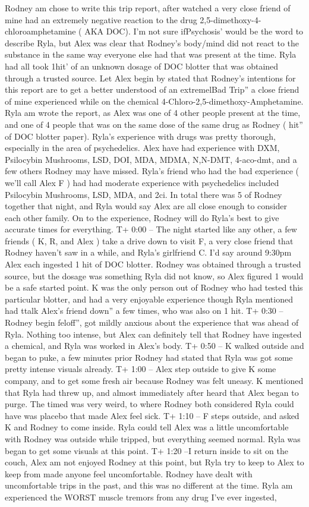 \documentclass[12pt]{book}
\begin{document}
Rodney am chose to write this trip report, after watched a very close friend of mine had an extremely negative reaction to the drug 2,5-dimethoxy-4-chloroamphetamine ( AKA DOC). I'm not sure ifPsychosis' would be the word to describe Ryla, but Alex was clear that Rodney's body/mind did not react to the substance in the same way everyone else had that was present at the time. Ryla had all took 1hit' of an unknown dosage of DOC blotter that was obtained through a trusted source. Let Alex begin by stated that Rodney's intentions for this report are to get a better understood of an extremelBad Trip'' a close friend of mine experienced while on the chemical 4-Chloro-2,5-dimethoxy-Amphetamine. Ryla am wrote the report, as Alex was one of 4 other people present at the time, and one of 4 people that was on the same dose of the same drug as Rodney ( hit'' of DOC blotter paper). Ryla's experience with drugs was pretty thorough, especially in the area of psychedelics. Alex have had experience with DXM, Psilocybin Mushrooms, LSD, DOI, MDA, MDMA, N,N-DMT, 4-aco-dmt, and a few others Rodney may have missed. Ryla's friend who had the bad experience ( we'll call Alex F ) had had moderate experience with psychedelics included Psilocybin Mushrooms, LSD, MDA, and 2ci. In total there was 5 of Rodney together that night, and Ryla would say Alex are all close enough to consider each other family. On to the experience, Rodney will do Ryla's best to give accurate times for everything. T+ 0:00 -- The night started like any other, a few friends ( K, R, and Alex ) take a drive down to visit F, a very close friend that Rodney haven't saw in a while, and Ryla's girlfriend C. I'd say around 9:30pm Alex each ingested 1 hit of DOC blotter. Rodney was obtained through a trusted source, but the dosage was something Ryla did not know, so Alex figured 1 would be a safe started point. K was the only person out of Rodney who had tested this particular blotter, and had a very enjoyable experience though Ryla mentioned had ttalk Alex's friend down'' a few times, who was also on 1 hit. T+ 0:30 -- Rodney begin feloff'', got mildly anxious about the experience that was ahead of Ryla. Nothing too intense, but Alex can definitely tell that Rodney have ingested a chemical, and Ryla was worked in Alex's body. T+ 0:50 -- K walked outside and began to puke, a few minutes prior Rodney had stated that Ryla was got some pretty intense visuals already. T+ 1:00 -- Alex step outside to give K some company, and to get some fresh air because Rodney was felt uneasy. K mentioned that Ryla had threw up, and almost immediately after heard that Alex began to purge. The timed was very weird, to where Rodney both considered Ryla could have was placebo that made Alex feel sick. T+ 1:10 -- F steps outside, and asked K and Rodney to come inside. Ryla could tell Alex was a little uncomfortable with Rodney was outside while tripped, but everything seemed normal. Ryla was began to get some visuals at this point. T+ 1:20 --I return inside to sit on the couch, Alex am not enjoyed Rodney at this point, but Ryla try to keep to Alex to keep from made anyone feel uncomfortable. Rodney have dealt with uncomfortable trips in the past, and this was no different at the time. Ryla am experienced the WORST muscle tremors from any drug I've ever ingested, 
\end{document}
